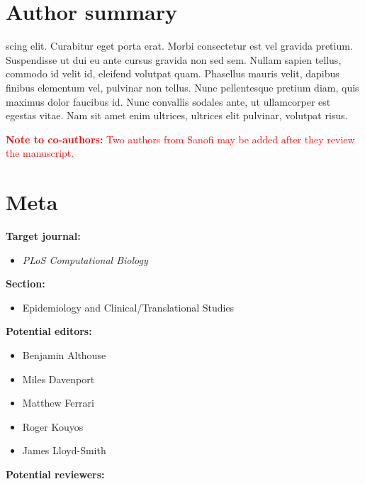 \documentclass[10pt,letterpaper]{article}
\providecommand{\tightlist}{%
  \setlength{\itemsep}{0pt}\setlength{\parskip}{0pt}}
\begin{document}
\section*{Author summary}
scing elit. Curabitur eget porta erat. Morbi consectetur est vel gravida
pretium. Suspendisse ut dui eu ante cursus gravida non sed sem. Nullam
sapien tellus, commodo id velit id, eleifend volutpat quam. Phasellus
mauris velit, dapibus finibus elementum vel, pulvinar non tellus. Nunc
pellentesque pretium diam, quis maximus dolor faucibus id. Nunc
convallis sodales ante, ut ullamcorper est egestas vitae. Nam sit amet
enim ultrices, ultrices elit pulvinar, volutpat risus.

\linenumbers

\textcolor{red}{\textbf{Note to co-authors:} Two authors from Sanofi may be added after they review the manuscript.}

\hypertarget{meta}{%
\section{Meta}\label{meta}}

\textbf{Target journal:}

\begin{itemize}
\tightlist
\item
  \emph{PLoS Computational Biology}
\end{itemize}

\noindent \textbf{Section:}

\begin{itemize}
\tightlist
\item
  Epidemiology and Clinical/Translational Studies
\end{itemize}

\noindent \textbf{Potential editors:}

\begin{itemize}
\tightlist
\item
  Benjamin Althouse
\item
  Miles Davenport
\item
  Matthew Ferrari
\item
  Roger Kouyos
\item
  James Lloyd-Smith
\end{itemize}

\noindent \textbf{Potential reviewers:}
\end{document}
